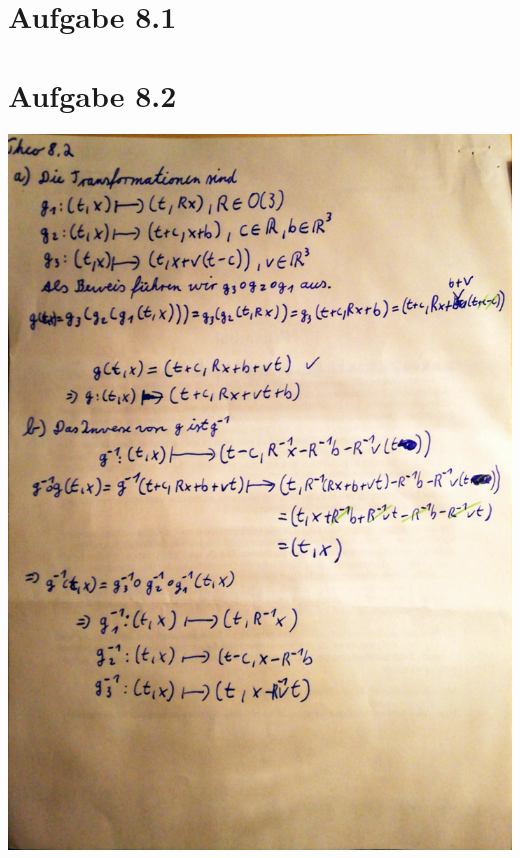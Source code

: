 \documentclass{theozettel}
\begin{document}

\section*{Aufgabe 8.1} 
\newpage
\section*{Aufgabe 8.2}	
\begin{center}
\includegraphics[width=14cm]{PTP8-2)_1.pdf}

\end{center}
\end{document}

